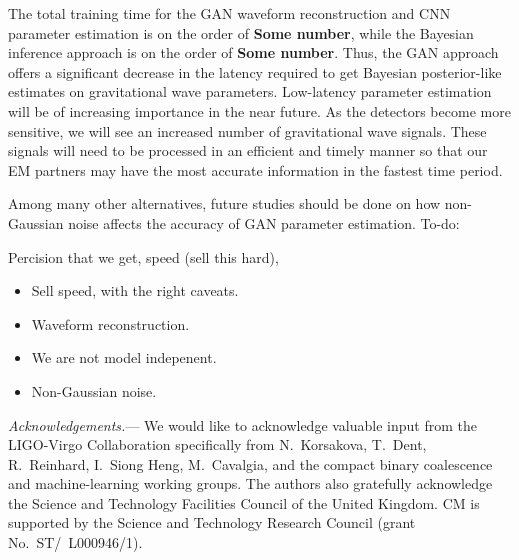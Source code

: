 \documentclass[%
showpacs,
 amsmath,amssymb,
 aps,
 twocolumn,
 prl,
 reprint,
floatfix,
]{revtex4-1}
\begin{document}
The total training time for the GAN waveform reconstruction and CNN parameter
estimation is on the order of \textbf{Some number}, while the Bayesian
inference approach is on the order of \textbf{Some number}. Thus, the GAN
approach offers a significant decrease in the latency required to get Bayesian
posterior-like estimates on gravitational wave parameters. Low-latency
parameter estimation will be of increasing importance in the near future. As
the detectors become more sensitive, we will see an increased number of
gravitational wave signals. These signals will need to be processed in an
efficient and timely manner so that our EM partners may have the most accurate
information in the fastest time period.   

Among many other alternatives, future studies should be done on how
non-Gaussian noise affects the accuracy of GAN parameter estimation.  To-do:

Percision that we get, speed (sell this hard), 

\begin{itemize}
\item Sell speed, with the right caveats.
\item Waveform reconstruction.
\item We are not model indepenent.
\item Non-Gaussian noise.
\end{itemize}

%
%
\emph{Acknowledgements.}---
%
We would like to acknowledge valuable input from the LIGO-Virgo Collaboration
specifically from N.~Korsakova, T.~Dent, R.~Reinhard, I.~Siong Heng,
M.~Cavalgia, and the compact binary coalescence and machine-learning working
groups. The authors also gratefully acknowledge the Science and Technology
Facilities Council of the United Kingdom. CM is supported by the Science and
Technology Research Council (grant No.~ST/~L000946/1).
%




\end{document}
